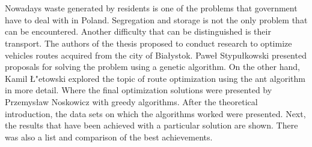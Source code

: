 \chapter*{}
 

Nowadays waste generated by residents is one of the problems that government have to deal with in Poland. Segregation and storage is not the only problem that can be encountered. Another difficulty that can be distinguished is their transport. The authors of the thesis proposed to conduct research to optimize vehicles routes acquired from the city of Bia{\l}ystok. Pawe{\l} Stypu{\l}kowski presented proposals for solving the problem using a genetic algorithm. On the other hand, Kamil {\L}{"e}towski explored the topic of route optimization using the ant algorithm in more detail. Where the final optimization solutions were presented by Przemys{\l}aw Noskowicz with greedy algorithms. After the theoretical introduction, the data sets on which the algorithms worked were presented. Next, the results that have been achieved with a particular solution are shown. There was also a list and comparison of the best achievements.

